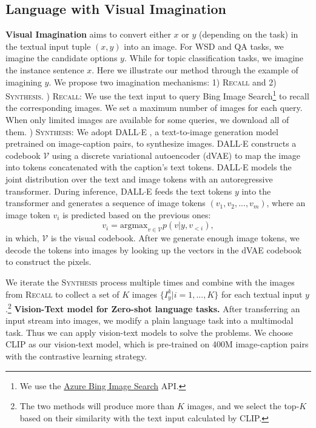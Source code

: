 \documentclass[11pt]{article}
\begin{document}
\subsection{Language with Visual Imagination}
\medbreak
\noindent\textbf{Visual Imagination} aims to convert either $x$ or $y$ (depending on the task) in the textual input tuple $(x, y)$ into an image. For WSD and QA tasks, we imagine the candidate options $y$. While for topic classification tasks, we imagine the instance sentence $x$. Here we illustrate our method through the example of imagining $y$. We propose two imagination mechanisms: 1) \textsc{Recall} and 2) \textsc{Synthesis}.
\medbreak
{}) \textsc{Recall}: We use the text input to query Bing Image Search\footnote{We use the \href{https://learn.microsoft.com/en-us/azure/cognitive-services/bing-image-search/overview}{Azure Bing Image Search} API.} to recall the corresponding images. We set a maximum number of images for each query. When only limited images are available for some queries, we download all of them.
\medbreak
{}) \textsc{Synthesis}: We adopt DALL$\cdot$E \cite{ramesh2021zero}, a text-to-image generation model pretrained on image-caption pairs, to synthesize images. DALL$\cdot$E constructs a codebook $\mathcal{V}$ using a discrete variational autoencoder (dVAE) \cite{rolfe2016discrete} to map the image into tokens concatenated with the caption's text tokens. DALL$\cdot$E models the joint distribution over the text and image tokens with an autoregressive transformer. During inference, DALL$\cdot$E feeds the text tokens $y$ into the transformer and generates a sequence of image tokens $(v_1, v_2, ..., v_m)$, where an image token $v_i$ is predicted based on the previous ones:
\begin{equation}
    v_i = \text{argmax}_{v \in \mathcal{V}}p(v | y, v_{<i}),
\end{equation}
in which, $\mathcal{V}$ is the visual codebook. After we generate enough image tokens, we decode the tokens into images by looking up the vectors in the dVAE codebook to construct the pixels. 

We iterate the \textsc{Synthesis} process multiple times and combine with the images from \textsc{Recall} to collect a set of $K$ images $\{I_y^k|i=1, ..., K\}$ for each textual input $y$.\footnote{The two methods will produce more than $K$ images, and we select the top-$K$ based on their similarity with the text input calculated by CLIP.}
\medbreak
\noindent\textbf{Vision-Text model for Zero-shot language tasks.} After transferring an input stream into images, we modify a plain language task into a multimodal task. Thus we can apply vision-text models to solve the problems. We choose CLIP \cite{radford2021learning} as our vision-text model, which is pre-trained on 400M image-caption pairs with the contrastive learning strategy. 
\end{document}
